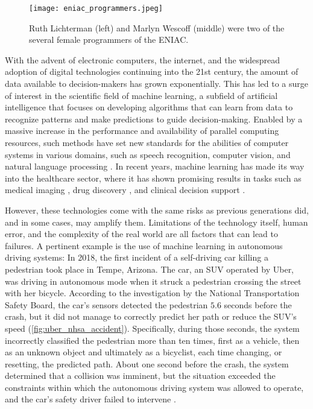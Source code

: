 \begin{figure}[t]
    \centering
    \texttt{[image: eniac\_programmers.jpeg]}
    \caption[Ruth Lichterman (left) and Marlyn Wescoff (middle) were two of the several female programmers of the ENIAC.]{Ruth Lichterman (left) and Marlyn Wescoff (middle) were two of the several female programmers of the ENIAC. \parencite[photo credit][]{usarmyresearchlaboratoryarltechnicallibrary_female_1940}}
    \label{fig:eniac_programmers}
\end{figure}

With the advent of electronic computers, the internet, and the widespread adoption of digital technologies continuing into the 21st century, the amount of data available to decision-makers has grown exponentially. 
This has led to a surge of interest in the scientific field of machine learning, a subfield of artificial intelligence that focuses on developing algorithms that can learn from data to recognize patterns and make predictions to guide decision-making. 
Enabled by a massive increase in the performance and availability of parallel computing resources, such methods have set new standards for the abilities of computer systems in various domains, such as speech recognition, computer vision, and natural language processing \parencite{lecun_deep_2015}. 
In recent years, machine learning has made its way into the healthcare sector, where it has shown promising results in tasks such as medical imaging \parencite{lundervold_overview_2019}, drug discovery \parencite{chen_rise_2018}, and clinical decision support \parencite{cite15, cite14}. 

However, these technologies come with the same risks as previous generations did, and in some cases, may amplify them. 
Limitations of the technology itself, human error, and the complexity of the real world are all factors that can lead to failures. A pertinent example is the use of machine learning in autonomous driving systems: 
In 2018, the first incident of a self-driving car killing a pedestrian took place in Tempe, Arizona. 
The car, an SUV operated by Uber, was driving in autonomous mode when it struck a pedestrian crossing the street with her bicycle. 
According to the investigation by the National Transportation Safety Board, the car's sensors detected the pedestrian $5.6$ seconds before the crash, but it did not manage to correctly predict her path or reduce the SUV's speed (\cref{fig:uber_nhsa_accident}). 
Specifically, during those seconds, the system incorrectly classified the pedestrian more than ten times, first as a vehicle, then as an unknown object and ultimately as a bicyclist, each time changing, or resetting, the predicted path. 
About one second before the crash, the system determined that a collision was imminent, but the situation exceeded the constraints within which the autonomous driving system was allowed to operate, and the car's safety driver failed to intervene \parencite{nationaltransportationsafetyboardnhsa_collision_2019}. 

